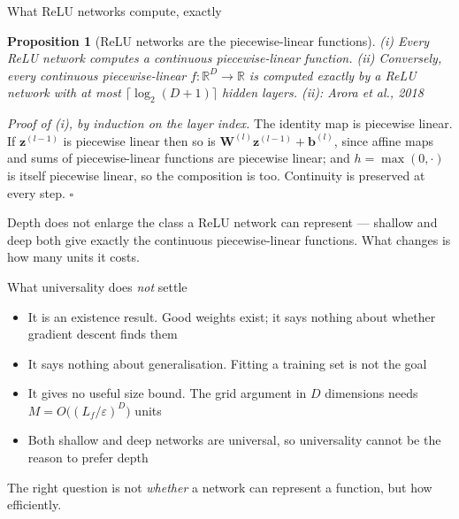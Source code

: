 \documentclass[aspectratio=169, 11pt]{beamer}
\newtheorem{propx}[theorem]{Proposition}
\newcommand{\src}[3]{}      %
\newcommand{\nosrc}{}       %
\begin{document}
\begin{frame}{What ReLU networks compute, exactly}
  \src{arora2018}{section}{2}
  \begin{propx}[ReLU networks are the piecewise-linear functions]
    {\small (i) Every ReLU network computes a \alert{continuous
    piecewise-linear} function. (ii) Conversely, every continuous
    piecewise-linear $f:\mathbb{R}^{D}\to\mathbb{R}$ is computed
    \alert{exactly} by a ReLU network with at most
    $\lceil\log_2(D{+}1)\rceil$ hidden layers.
    \hfill{\scriptsize (ii): Arora et al., 2018}}
  \end{propx}
  \vspace{0.1em}
  {\footnotesize
  \emph{Proof of (i), by induction on the layer index.} The identity
  map is piecewise linear. If $\mathbf{z}^{(l-1)}$ is piecewise
  linear then so is $\mathbf{W}^{(l)}\mathbf{z}^{(l-1)}
  +\mathbf{b}^{(l)}$, since affine maps and sums of piecewise-linear
  functions are piecewise linear; and $h=\max(0,\cdot)$ is itself
  piecewise linear, so the composition is too. Continuity is
  preserved at every step. \hfill$\square$}
  \vspace{-0.1em}
  \begin{redhighlight}
    {\scriptsize Depth does \alert{not} enlarge the class a ReLU
    network can represent --- shallow and deep both give exactly the
    continuous piecewise-linear functions. What changes is
    \alert{how many units} it costs.}
  \end{redhighlight}
\end{frame}

\begin{frame}{What universality does \emph{not} settle}
  \nosrc
  \vspace{0.2em}
  \begin{itemize}\setlength{\itemsep}{5pt}
    \item \alert{It is an existence result.} Good weights exist; it
          says nothing about whether gradient descent finds them
    \item \alert{It says nothing about generalisation.} Fitting a
          training set is not the goal
    \item \alert{It gives no useful size bound.} The grid argument
          in $D$ dimensions needs
          $M=O\big((L_{\!f}/\varepsilon)^{D}\big)$ units
    \item \alert{Both shallow and deep networks are universal}, so
          universality cannot be the reason to prefer depth
  \end{itemize}
  \vspace{0.4em}
  \begin{redhighlight}
    The right question is not \emph{whether} a network can represent
    a function, but \alert{how efficiently}.
  \end{redhighlight}
\end{frame}
\end{document}
